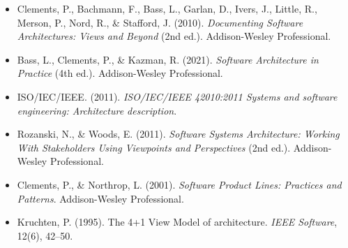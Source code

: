 \documentclass[11pt]{article}
\begin{document}
\begin{itemize}
  \item Clements, P., Bachmann, F., Bass, L., Garlan, D., Ivers, J., Little, R., Merson, P., Nord, R., \& Stafford, J. (2010). \textit{Documenting Software Architectures: Views and Beyond} (2nd ed.). Addison-Wesley Professional.
  \item Bass, L., Clements, P., \& Kazman, R. (2021). \textit{Software Architecture in Practice} (4th ed.). Addison-Wesley Professional.
  \item ISO/IEC/IEEE. (2011). \textit{ISO/IEC/IEEE 42010:2011 Systems and software engineering: Architecture description}.
  \item Rozanski, N., \& Woods, E. (2011). \textit{Software Systems Architecture: Working With Stakeholders Using Viewpoints and Perspectives} (2nd ed.). Addison-Wesley Professional.
  \item Clements, P., \& Northrop, L. (2001). \textit{Software Product Lines: Practices and Patterns}. Addison-Wesley Professional.
  \item Kruchten, P. (1995). The 4+1 View Model of architecture. \textit{IEEE Software}, 12(6), 42--50.
\end{itemize}
\end{document}
